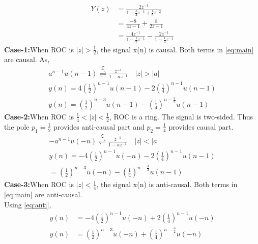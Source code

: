\documentclass[journal,12pt,twocolumn]{IEEEtran}
\providecommand{\brak}[1]{\ensuremath{\left(#1\right)}}
\providecommand{\abs}[1]{\left\vert#1\right\vert}
\providecommand{\ztrans}{\overset{\mathcal{Z}}{ \rightleftharpoons}}
\numberwithin{equation}{section}
\begin{document}
\begin{align}
    Y(z) & =\frac{2z^{-1}}{1-\frac{3}{4}z^{-1}+\frac{1}{8}z^{-2}}                   \\
         & =\frac{-8}{4z-1}+\frac{8}{2z-1}                                          \\
    \label{eq:main}
         & =\frac{4z^{-1}}{1-\frac{1}{2}z^{-1}}-\frac{2z^{-1}}{1-\frac{1}{4}z^{-1}}
\end{align}
\textbf{Case-1:}When ROC is $\abs{z}>\frac{1}{2}$, the signal x(n) is causal. Both terms in \eqref{eq:main} are causal.
As,
\begin{align}
    \label{eq:anti}
    a^{n-1}u(n-1) \ztrans \frac{z^{-1}}{1-az^{-1}} \quad \abs{z} > \abs{a} \\
    y(n)=4\brak{\frac{1}{2}}^{n-1}u(n-1)-2\brak{\frac{1}{4}}^{n-1}u(n-1)   \\
    y(n)=\brak{\frac{1}{2}}^{n-3}u(n-1)-\brak{\frac{1}{4}}^{n-\frac{3}{2}}u(n-1)
\end{align}
\textbf{Case-2:}When ROC is $\frac{1}{4}<\abs{z}<\frac{1}{2}$, ROC is a ring. The signal is two-sided. Thus the pole $p_1=\frac{1}{2}$ provides anti-causal part and $p_2=\frac{1}{4}$ provides causal part.
\begin{align}
    -a^{n-1}u(-n) \ztrans \frac{z^{-1}}{1-az^{-1}} \quad \abs{z} < \abs{a} \\
    y(n)=-4\brak{\frac{1}{2}}^{n-1}u(-n)-2\brak{\frac{1}{4}}^{n-1}u(n-1)   \\
    =\brak{\frac{1}{2}}^{n-3}u(-n)-\brak{\frac{1}{4}}^{n-\frac{3}{2}}u(n-1)
\end{align}
\textbf{Case-3:}When ROC is $\abs{z}<\frac{1}{4}$, the signal x(n) is anti-causal. Both terms in \eqref{eq:main} are anti-causal.\\
Using \eqref{eq:anti},
\begin{align}
    y(n) & =-4\brak{\frac{1}{2}}^{n-1}u(-n)+2\brak{\frac{1}{4}}^{n-1}u(-n)        \\
    y(n) & =\brak{\frac{1}{2}}^{n-3}u(-n)+\brak{\frac{1}{4}}^{n-\frac{3}{2}}u(-n)
\end{align}
\end{document}
